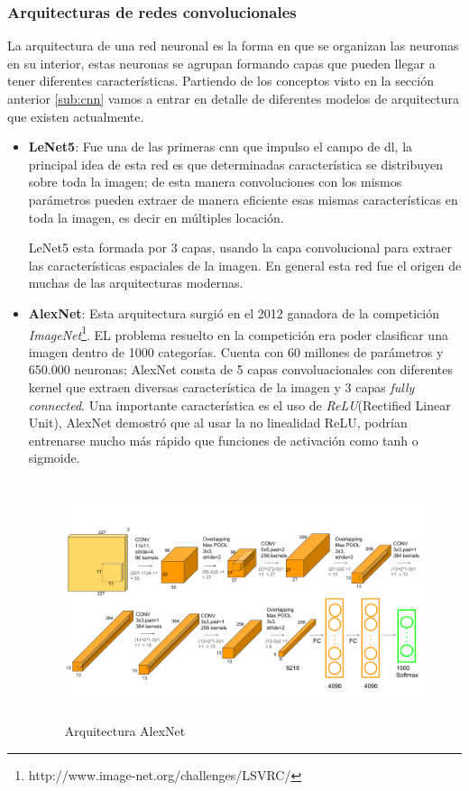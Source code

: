 \subsubsection{Arquitecturas de redes convolucionales}\label{sub:arquitecturacnn}
La arquitectura de una red neuronal es la forma en que se organizan  las neuronas en su interior, estas neuronas se agrupan formando capas que pueden llegar a tener diferentes características. Partiendo de los conceptos visto en la sección anterior \ref{sub:cnn} vamos a entrar en detalle de diferentes modelos de arquitectura que existen actualmente.

\begin{itemize}
\item \textbf{LeNet5}: Fue una de las primeras \ac{cnn} que impulso el campo de \ac{dl}, la principal idea de esta red es que determinadas característica se distribuyen sobre toda la imagen; de esta manera convoluciones con los mismos parámetros pueden extraer de manera eficiente esas mismas características en toda la imagen, es decir en múltiples locación. 

LeNet5 esta formada por 3 capas, usando la capa convolucional para extraer las características espaciales de la imagen. En general esta red fue el origen de muchas de las arquitecturas modernas.

\item \textbf{AlexNet}: Esta arquitectura surgió en el 2012 ganadora de la competición \textit{ImageNet}\footnote{http://www.image-net.org/challenges/LSVRC/}. EL problema resuelto en la competición era poder clasificar una imagen dentro de 1000 categorías. Cuenta con 60 millones de parámetros y 650.000 neuronas; AlexNet consta de 5 capas convoluacionales con diferentes kernel que extraen diversas característica de la imagen  y 3 capas \textit{fully connected}. Una importante característica es el uso de \textit{ReLU}(Rectified Linear Unit),  AlexNet demostró que al usar la no linealidad ReLU,  podrían entrenarse mucho más rápido que  funciones de activación como  tanh o sigmoide.

\begin{figure}[H]
 \centering
  \includegraphics[height=7cm,keepaspectratio=true,clip=true]{imagenes/MarcoTeorico/AlexNet-1.png}
  \caption{Arquitectura AlexNet}
	\label{Fig:alexnet}
\end{figure}



\end{itemize}
